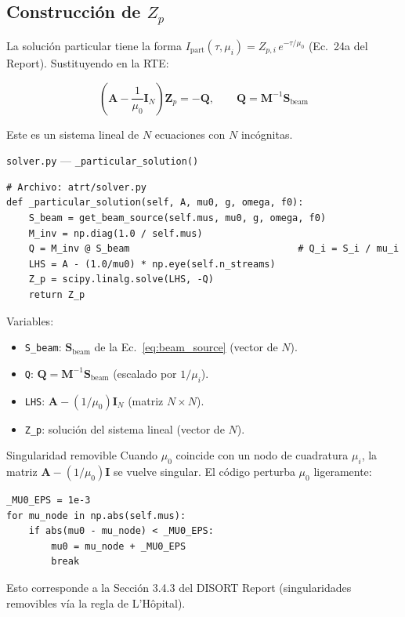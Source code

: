 \documentclass[a4paper,11pt]{article}
\begin{document}
\subsection{Construcci\'on de $Z_p$}

La soluci\'on particular tiene la forma $I_{\text{part}}(\tau, \mu_i) = Z_{p,i} \, e^{-\tau/\mu_0}$ (Ec.\ 24a del Report). Sustituyendo en la RTE:

\begin{equation}
\boxed{\left(\mathbf{A} - \frac{1}{\mu_0}\mathbf{I}_N\right) \mathbf{Z}_p = -\mathbf{Q}, \qquad \mathbf{Q} = \mathbf{M}^{-1} \mathbf{S}_{\text{beam}}}
\label{eq:Zp}
\end{equation}

Este es un sistema lineal de $N$ ecuaciones con $N$ inc\'ognitas.

\begin{implementation}{\texttt{solver.py} --- \texttt{\_particular\_solution()}}
\begin{lstlisting}
# Archivo: atrt/solver.py
def _particular_solution(self, A, mu0, g, omega, f0):
    S_beam = get_beam_source(self.mus, mu0, g, omega, f0)
    M_inv = np.diag(1.0 / self.mus)
    Q = M_inv @ S_beam                              # Q_i = S_i / mu_i
    LHS = A - (1.0/mu0) * np.eye(self.n_streams)
    Z_p = scipy.linalg.solve(LHS, -Q)
    return Z_p
\end{lstlisting}
Variables:
\begin{itemize}
\item \texttt{S\_beam}: $\mathbf{S}_{\text{beam}}$ de la Ec.~\eqref{eq:beam_source} (vector de $N$).
\item \texttt{Q}: $\mathbf{Q} = \mathbf{M}^{-1}\mathbf{S}_{\text{beam}}$ (escalado por $1/\mu_i$).
\item \texttt{LHS}: $\mathbf{A} - (1/\mu_0)\mathbf{I}_N$ (matriz $N \times N$).
\item \texttt{Z\_p}: soluci\'on del sistema lineal (vector de $N$).
\end{itemize}
\end{implementation}

\begin{concept}{Singularidad removible}
Cuando $\mu_0$ coincide con un nodo de cuadratura $\mu_i$, la matriz $\mathbf{A} - (1/\mu_0)\mathbf{I}$ se vuelve singular.  El c\'odigo perturba $\mu_0$ ligeramente:
\begin{lstlisting}
_MU0_EPS = 1e-3
for mu_node in np.abs(self.mus):
    if abs(mu0 - mu_node) < _MU0_EPS:
        mu0 = mu_node + _MU0_EPS
        break
\end{lstlisting}
Esto corresponde a la Secci\'on 3.4.3 del DISORT Report (singularidades removibles v\'ia la regla de L'H\^opital).
\end{concept}
\end{document}
